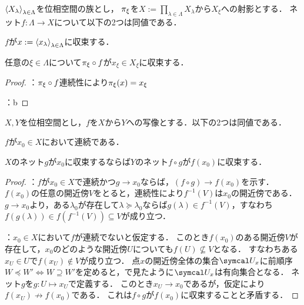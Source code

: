 \documentclass{ltjsbook}
\begin{document}
\begin{thmbox}
\begin{proposition}
\({\langle {X}_\lambda \rangle}_{\lambda \in \Lambda}\)を位相空間の族とし，
\(\pi_{\xi}\)を\(X := \prod_{\lambda \in \Lambda} X_\lambda\)から\(X_\xi\)への射影とする．
ネット\(f \colon \Lambda \to X\)について以下の2つは同値である．
\begin{conditions}
    \item\label{net-whole-convergence} \(f\)が\(x := {\langle {x}_{\lambda} \rangle}_{\lambda \in \Lambda}\)に収束する．
    \item\label{net-elementwise-convergence} 任意の\(\xi \in \Lambda\)について\(\pi_{\xi} \circ f\)が\(x_\xi \in X_\xi\)に収束する．
\end{conditions}
\end{proposition}
\end{thmbox}

\begin{proof}：\(\pi_{\xi} \circ f\)連続性により\(\pi_{\xi} (x) = x_\xi\)

：b

\end{proof}

\begin{thmbox}
\begin{theorem}
\(X, Y\)を位相空間とし，\(f\)を\(X\)から\(Y\)への写像とする．以下の2つは同値である．
\begin{conditions}
    \item\label{net-continuous} \(f\)が\(x_0 \in X\)において連続である．
    \item\label{net-f-lim-x-lim-f-x} \(X\)のネット\(g\)が\(x_0\)に収束するならば\(Y\)のネット\(f \circ g\)が\(f (x_0)\)に収束する．
\end{conditions}
\end{theorem}
\end{thmbox}

\begin{proof}
：\(f\)が\(x_0 \in X\)で連続かつ\(g \to x_0\)ならば，\((f \circ g) \to f (x_0)\)を示す．
\(f(x_0)\)の任意の開近傍\(V\)をとると，連続性により\(f^{-1}(V)\)は\(x_0\)の開近傍である．
\(g \to x_0\)より，ある\(\lambda_0\)が存在して\(\lambda \succeq \lambda_0\)ならば\(g(\lambda) \in f^{-1}(V)\)，すなわち\(f(g(\lambda)) \in f(f^{-1}(V)) \subseteq V\)が成り立つ．

：\(x_0 \in X\)において\(f\)が連続でないと仮定する．
このとき\(f(x_0)\)のある開近傍\(V\)が存在して，\(x_0\)のどのような開近傍\(U\)についても\(f(U) \not \subseteq V\)となる．
すなわちある\(x_U \in U\)で\(f(x_U) \not\in V\)が成り立つ．
点\(x\)の開近傍全体の集合\(\OpenNeighborhood{x}\)に前順序\(W \preceq W' \Leftrightarrow W \supseteq W'\)を定めると，で見たように\(\OpenNeighborhood{x}\)は有向集合となる．
ネット\(g\)を\(g \colon U \mapsto x_U\)で定義する．
このとき\(x_U \to x_0\)であるが，仮定により\(f(x_U) \not\to f(x_0)\)である．
これは\(f \circ g\)が\(f(x_0)\)に収束することと矛盾する．
\end{proof}
\end{document}
